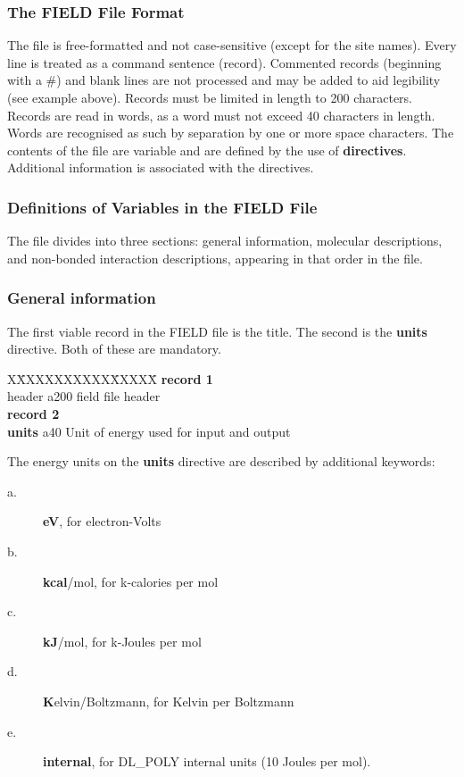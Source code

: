 \subsubsection{The FIELD File Format}

The file is free-formatted and not case-sensitive (except for the site names).
Every line is treated as a command sentence (record).  Commented records
(beginning with a \#) and blank lines are not processed and may be
added to aid legibility (see example above).  Records must be
limited in length to 200 characters.  Records are read in words,
as a word must not exceed 40 characters in length.  Words are
recognised as such by separation by one or more space characters.
The contents of the file are variable and are defined by the use
of {\bf directives}.  Additional information is associated with
the directives.

\subsubsection{Definitions of Variables in the FIELD File}

The file divides into three sections: general information, molecular
descriptions, and non-bonded interaction
descriptions, appearing in that order in the file.

\subsubsection*{General information}

The first viable record in the FIELD file is the title.  The
second is the {\bf units} directive.  Both of these are mandatory.
\begin{tabbing}
X\=XXXXXXXXXX\=XXXXX\=\kill
{\bf record 1} \\
\> header      \> a200 \> field file header \\
{\bf record 2}\\
\> {\bf units} \> a40  \> Unit of energy used for input and output
\end{tabbing}
\noindent The energy units on the {\bf units} directive are
described by additional keywords:
\begin{description}
\item[a.] {\bf eV}, for electron-Volts
\item[b.] {\bf kcal}/mol, for k-calories per mol
\item[c.] {\bf kJ}/mol, for k-Joules per mol
\item[d.] {\bf K}elvin/Boltzmann, for Kelvin per Boltzmann
\item[e.] {\bf internal}, for DL\_POLY internal units (10 Joules per mol).
\end{description}

